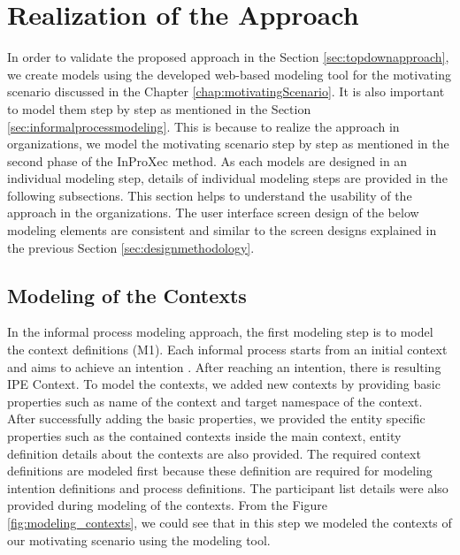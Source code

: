 \section{Realization of the Approach}
\label{sec:realization}
In order to validate the proposed approach in the Section \ref{sec:topdownapproach}, we create models using the developed web-based modeling tool for the motivating scenario discussed in the Chapter \ref{chap:motivatingScenario}. It is also important to model them step by step as mentioned in the Section \ref{sec:informalprocessmodeling}. This is because to realize the approach in organizations, we model the motivating scenario step by step as mentioned in the second phase of the InProXec method. As each models are designed in an individual modeling step, details of individual modeling steps are provided in the following subsections. This section helps to understand the usability of the approach in the organizations. The user interface screen design of the below modeling elements are consistent and similar to the screen designs explained in the previous Section \ref{sec:designmethodology}.

\subsection{Modeling of the Contexts}
In the informal process modeling approach, the first modeling step is to model the context definitions (M1). Each informal process starts from an initial context and aims to achieve an intention \cite{Sungur2014a}. After reaching an intention, there is resulting IPE Context. To model the contexts, we added new contexts by providing basic properties such as name of the context and target namespace of the context. After successfully adding the basic properties, we provided the entity specific properties such as the contained contexts inside the main context, entity definition details about the contexts are also provided. The required context definitions are modeled first because these definition are required for modeling intention definitions and process definitions. The participant list details were also provided during modeling of the contexts. From the Figure \ref{fig:modeling_contexts}, we could see that in this step we modeled the contexts of our motivating scenario using the modeling tool. 

